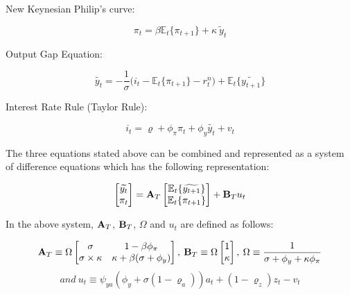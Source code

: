 \documentclass[12pt]{article}
\newcommand{\1}{\mathbbm 1}
\renewcommand{\rho}{\varrho}
\begin{document}
	New Keynesian Philip's curve: 
	
	\begin{equation}
		\pi_{t} = \beta \mathbb{E}_{t}\{\pi_{t+1}\} + \kappa \: \widetilde{y}_{t}
	\end{equation}

Output Gap Equation:

	\begin{equation}
	\widetilde{y_{t}} = -\frac{1}{\sigma} \big(i_{t} - \mathbb{E}_{t}\{\pi_{t+1}\} - r_{t}^{n}\big) + \mathbb{E}_{t}\{\widetilde{y_{t+1}}\}
\end{equation}

Interest Rate Rule (Taylor Rule):

\begin{equation}
	i_{t} = \rho + \phi_{\pi} \pi_{t} + \phi_{y} \widetilde{y_{t}} + v_{t} 
\end{equation}


The three equations stated above can be combined and represented as a system of difference equations which has the following representation:


	\begin{equation}
		\begin{bmatrix}
			\widetilde{y_{t}}  \\
			\pi_{t} \\
		\end{bmatrix} = {\bf{A}}_{T} \begin{bmatrix}
		\mathbb{E}_{t}\{\widetilde{y_{t+1}}\}  \\
		\mathbb{E}_{t}\{{\pi_{t+1}}\} \end{bmatrix} + {\bf{B}}_{T} u_{t} \\
	\end{equation}


In the above system, ${\bf{A}}_{T}$, ${\bf{B}}_{T}$, $\Omega$ and $u_{t}$ are defined as follows:

	\begin{equation*}
		{\bf{A}}_{T} \equiv \Omega 
		\begin{bmatrix}
			\sigma & 1 - \beta \phi_{\pi}  \\
			\sigma \times \kappa & \kappa + \beta (\sigma + \phi_{y}) \\
		\end{bmatrix}, \:
		{\bf{B}}_{T} \equiv \Omega \begin{bmatrix}
			1 \\
			\kappa \\
		\end{bmatrix}, \: \Omega \equiv \frac{1}{\sigma + \phi_{y} + \kappa \phi_{\pi}}
	\end{equation*}
\begin{equation*}
and \: u_{t} \equiv \psi_{ya}(\phi_{y} + \sigma (1 - \rho_{a}))a_{t} + (1 - \rho_{z})z_{t} - v_{t}
\end{equation*}
\end{document}
